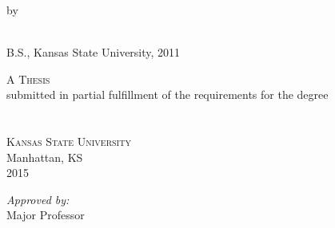 \documentclass[12pt, a4paper, oneside]{Thesis}
\begin{document}
\begin{titlepage}
\begin{center}

\HRule \\[0.4cm] %
{\huge \textsc \ttitle}\\[0.4cm] %
\HRule \\ %
 
{\large by}

{\huge \textsc \authornames}\\[0.4cm] %

\large B.S., Kansas State University, 2011

 
\large A \textsc{Thesis}\\submitted in partial fulfillment of the requirements 
for the degree \\\degreename\\ %
\deptname\\[1cm] %

{\large{\textsc{Kansas State University}\\Manhattan, KS}}\\[1cm] %
 
{\large 2015}\\[1cm] %

\begin{flushright} \large
\emph{Approved by:} \\
Major Professor \\
{\supname}
\end{flushright}
 
\vfill
\end{center}

\end{titlepage}
\end{document}
